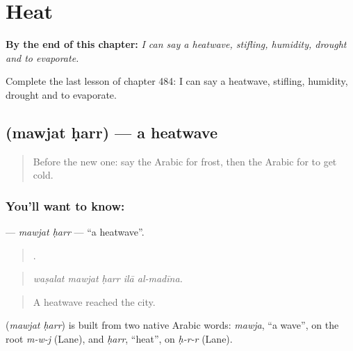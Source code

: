 
\chapter{Heat}
\label{ch:ar-heat}

\begin{chapteropening}
\textbf{By the end of this chapter:} \emph{I can say a heatwave, stifling, humidity, drought and to evaporate.}

Complete the last lesson of chapter 484: I can say a heatwave, stifling, humidity, drought and to evaporate.
\end{chapteropening}

\section[\texorpdfstring{\ar{موجة} \ar{حر} (mawjat ḥarr)}{موجة حر (mawjat ḥarr)}]{  (mawjat ḥarr) — a heatwave}

\label{lesson:AR-C484-mawjat-harr}



\begin{quote}
Before the new one: say the Arabic for frost, then the Arabic for to get cold.
\end{quote}

\subsection*{You'll want to know:  }
\textbf{ } — \emph{mawjat ḥarr} — \textquotedblleft{}a heatwave\textquotedblright{}.

\begin{quote}
    .
\end{quote}

\begin{quote}
\emph{waṣalat mawjat ḥarr ilā al-madīna.}
\end{quote}

\begin{quote}
A heatwave reached the city.
\end{quote}

\begin{cousinweb}
\textbf{ } (\emph{mawjat ḥarr}) is built from two native Arabic words: \emph{mawja}, \textquotedblleft{}a wave\textquotedblright{}, on the root \emph{m-w-j} (Lane), and \emph{ḥarr}, \textquotedblleft{}heat\textquotedblright{}, on \emph{ḥ-r-r} (Lane).
\end{cousinweb}

